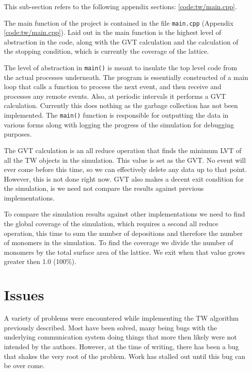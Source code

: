 This sub-section refers to the following appendix sections: \ref{code:tw/main.cpp}.

The main function of the project is contained in the file \texttt{main.cpp} (Appendix \ref{code:tw/main.cpp}).  Laid out in the main function is the highest level of abstraction in the code, along with the GVT calculation and the calculation of the stopping condition, which is currently the coverage of the lattice.

The level of abstraction in \texttt{main()} is meant to insulate the top level code from the actual processes underneath.  The program is essentially constructed of a main loop that calls a function to process the next event, and then receive and processes any remote events.  Also, at periodic intervals it performs a GVT calculation.  Currently this does nothing as the garbage collection has not been implemented.  The \texttt{main()} function is responsible for outputting the data in various forms along with logging the progress of the simulation for debugging purposes.

The GVT calculation is an all reduce operation that finds the minimum LVT of all the TW objects in the simulation.  This value is set as the GVT.  No event will ever come before this time, so we can effectively delete any data up to that point.  However, this is not done right now.  GVT also makes a decent exit condition for the simulation, is we need not compare the results against previous implementations.

To compare the simulation results against other implementations we need to find the global coverage of the simulation, which requires a second all reduce operation, this time to sum the number of depositions and therefore the number of monomers in the simulation.  To find the coverage we divide the number of monomers by the total surface area of the lattice.  We exit when that value grows greater then 1.0 (100\%).

\section{Issues}

A variety of problems were encountered while implementing the TW algorithm previously described.  Most have been solved, many being bugs with the underlying communication system doing things that more then likely were not intended by the authors.  However, at the time of writing, there has been a bug that shakes the very root of the problem.  Work has stalled out until this bug can be over come.

